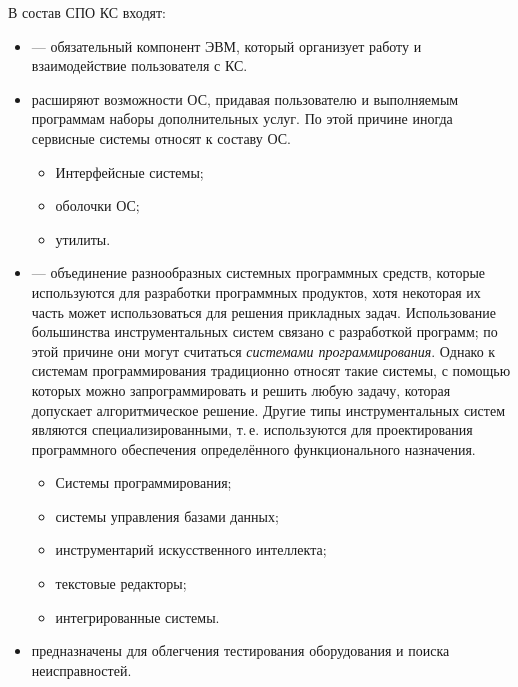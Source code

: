\documentclass[a5paper, 10pt, notitlepage, pdftex,headsepline]{scrartcl}
\begin{document}
  В состав СПО КС входят:
  \begin{itemize}
    \item {} --- обязательный компонент ЭВМ, который
      организует работу и взаимодействие пользователя с КС.
    \item {} расширяют возможности ОС, придавая
      пользователю и выполняемым программам наборы дополнительных услуг.
      По этой причине иногда сервисные системы относят к составу ОС.
      \begin{itemize}
        \item Интерфейсные системы;
        \item оболочки ОС;
        \item утилиты.
      \end{itemize}
    \item {} --- объединение разнообразных
      системных программных средств, которые используются для разработки
      программных продуктов, хотя некоторая их часть может
      использоваться для решения прикладных задач.
      Использование большинства инструментальных систем связано с
      разработкой программ; по этой причине они могут считаться
      \textit{системами программирования}.
      Однако к системам программирования традиционно относят такие
      системы, с помощью которых можно запрограммировать и решить любую
      задачу, которая допускает алгоритмическое решение.
      Другие типы инструментальных систем являются специализированными,
      т.\,е. используются для проектирования программного обеспечения
      определённого функционального назначения.
      \begin{itemize}
        \item Системы программирования;
        \item системы управления базами данных;
        \item инструментарий искусственного интеллекта;
        \item текстовые редакторы;
        \item интегрированные системы.
      \end{itemize}
    \item {} предназначены для
      облегчения тестирования оборудования и поиска неисправностей.
  \end{itemize}
\end{document}
